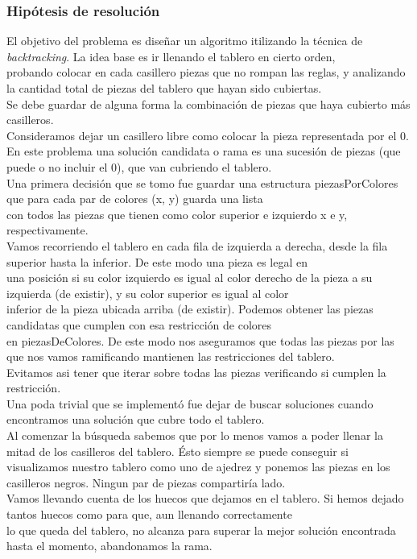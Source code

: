 \documentclass[11pt, a4paper, twoside]{article}
\begin{document}
\subsubsection{Hipótesis de resolución}
El objetivo del problema es diseñar un algoritmo itilizando la técnica de \textit{backtracking}. La idea base es ir llenando el tablero en cierto orden, \\
probando colocar en cada casillero piezas que no rompan las reglas, y analizando la cantidad total de piezas del tablero que hayan sido cubiertas.\\
Se debe guardar de alguna forma la combinación de piezas que haya cubierto más casilleros. \\
Consideramos dejar un casillero libre como colocar la pieza representada por el 0.\\
En este problema una solución candidata o rama es una sucesión de piezas (que puede o no incluir el 0), que van cubriendo el tablero.\\
Una primera decisión que se tomo fue guardar una estructura piezasPorColores que para cada par de colores (x, y) guarda una lista \\
con todos las piezas que tienen como color superior e izquierdo x e y, respectivamente.\\
Vamos recorriendo el tablero en cada fila de izquierda a derecha, desde la fila superior hasta la inferior. De este modo una pieza es legal en\\
una posición si su color izquierdo es igual al color derecho de la pieza a su izquierda (de existir), y su color superior es igual al color\\
inferior de la pieza ubicada arriba (de existir). Podemos obtener las piezas candidatas que cumplen con esa restricción de colores\\
en piezasDeColores. De este modo nos aseguramos que todas las piezas por las que nos vamos ramificando mantienen las restricciones del tablero.\\
Evitamos asi tener que iterar sobre todas las piezas verificando si cumplen la restricción.\\
Una poda trivial que se implementó fue dejar de buscar soluciones cuando encontramos una solución que cubre todo el tablero.\\
Al comenzar la búsqueda sabemos que por lo menos vamos a poder llenar la mitad de los casilleros del tablero. Ésto siempre se puede conseguir si\\
visualizamos nuestro tablero como uno de ajedrez y ponemos las piezas en los casilleros negros. Ningun par de piezas compartiría lado.\\
Vamos llevando cuenta de los huecos que dejamos en el tablero. Si hemos dejado tantos huecos como para que, aun llenando correctamente\\
lo que queda del tablero, no alcanza para superar la mejor solución encontrada hasta el momento, abandonamos la rama.\\
\end{document}

